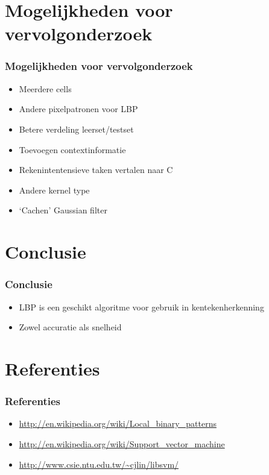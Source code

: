 \documentclass{beamer}
\begin{document}
    \section{Mogelijkheden voor vervolgonderzoek}

    \begin{frame}
        \frametitle{Mogelijkheden voor vervolgonderzoek}

        \begin{itemize}
            \item Meerdere cells
            \item Andere pixelpatronen voor LBP
            \item Betere verdeling leerset/testset
            \item Toevoegen contextinformatie
        \end{itemize}

        \begin{itemize}
            \item Rekenintentensieve taken vertalen naar C
            \item Andere kernel type
            \item `Cachen' Gaussian filter
        \end{itemize}
    \end{frame}

    \section{Conclusie}

    \begin{frame}
        \frametitle{Conclusie}

        \begin{itemize}
            \item LBP is een geschikt algoritme voor gebruik in
            kentekenherkenning
            \item Zowel accuratie als snelheid
        \end{itemize}
    \end{frame}

    \section{Referenties}

    \begin{frame}
        \frametitle{Referenties}

        \begin{itemize}
            \item \url{http://en.wikipedia.org/wiki/Local\_binary\_patterns}
            \item \url{http://en.wikipedia.org/wiki/Support\_vector\_machine}
            \item \url{http://www.csie.ntu.edu.tw/~cjlin/libsvm/}
        \end{itemize}
    \end{frame}
\end{document}
